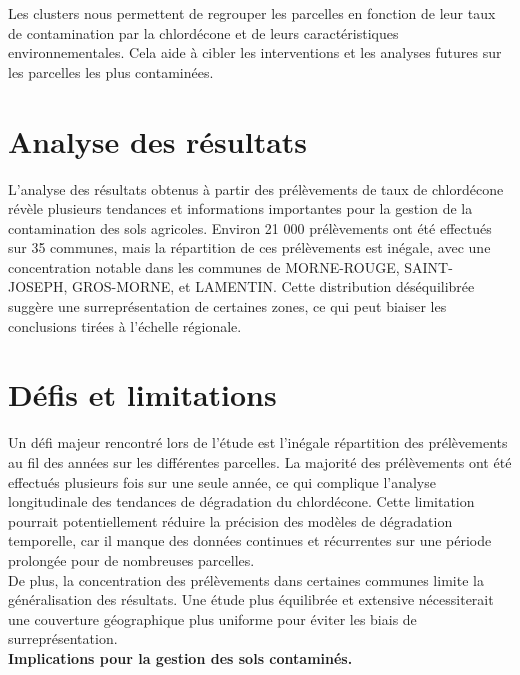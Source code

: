 \documentclass{report}
\begin{document}
Les clusters nous permettent de regrouper les parcelles en fonction de leur taux de contamination par la chlordécone et de leurs caractéristiques environnementales. Cela aide à cibler les interventions et les analyses futures sur les parcelles les plus contaminées.\\
 

\section*{Analyse des résultats}

L'analyse des résultats obtenus à partir des prélèvements de taux de chlordécone révèle plusieurs tendances et informations importantes pour la gestion de la contamination des sols agricoles. Environ 21 000 prélèvements ont été effectués sur 35 communes, mais la répartition de ces prélèvements est inégale, avec une concentration notable dans les communes de MORNE-ROUGE, SAINT-JOSEPH, GROS-MORNE, et LAMENTIN. Cette distribution déséquilibrée suggère une surreprésentation de certaines zones, ce qui peut biaiser les conclusions tirées à l'échelle régionale.\\

\section*{Défis et limitations}

Un défi majeur rencontré lors de l’étude est l'inégale répartition des prélèvements au fil des années sur les différentes parcelles. La majorité des prélèvements ont été effectués plusieurs fois sur une seule année, ce qui complique l'analyse longitudinale des tendances de dégradation du chlordécone. Cette limitation pourrait potentiellement réduire la précision des modèles de dégradation temporelle, car il manque des données continues et récurrentes sur une période prolongée pour de nombreuses parcelles.\\

De plus, la concentration des prélèvements dans certaines communes limite la généralisation des résultats. Une étude plus équilibrée et extensive nécessiterait une couverture géographique plus uniforme pour éviter les biais de surreprésentation.\\

\large\textbf{Implications pour la gestion des sols contaminés.}\\
\end{document}
